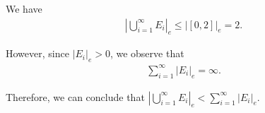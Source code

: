 \documentclass[UTF8,a4paper,10pt]{article}
\begin{document}
\begin{solution}
We have
\begin{equation*}
  \begin{aligned}
\left|\bigcup_{i=1}^{\infty} E_i\right|_e
\leq |[0,2]|_e = 2.
\end{aligned}
\end{equation*}

However, since \(|E_i|_e>0\), we observe that
\begin{equation*}
  \begin{aligned}
    \sum_{i=1}^{\infty}|E_i|_e = \infty.
\end{aligned}
\end{equation*}

Therefore, we can conclude that \(\left|\bigcup_{i=1}^{\infty} E_i\right|_e < \sum_{i=1}^{\infty}|E_i|_e\).


  \end{solution}
\end{document}
